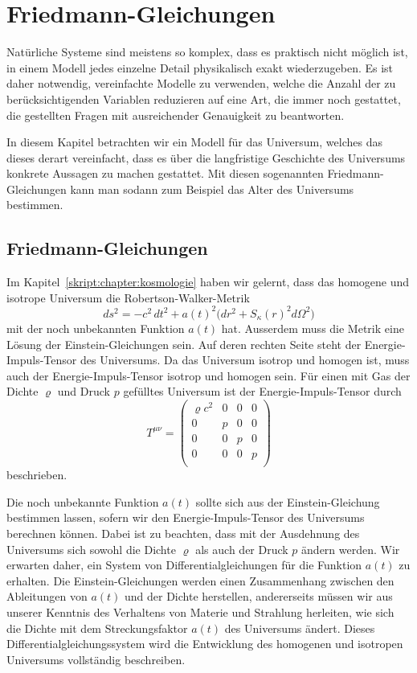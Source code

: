 %
%
%
\chapter{Friedmann-Gleichungen%
\label{skript:chapter:friedmann}}
\rhead{}
Natürliche Systeme sind meistens so komplex, dass es praktisch nicht
möglich ist, in einem Modell jedes einzelne Detail physikalisch exakt
wiederzugeben.
Es ist daher notwendig, vereinfachte Modelle zu verwenden, welche 
die Anzahl der zu berücksichtigenden Variablen reduzieren auf eine
Art, die immer noch gestattet, die gestellten Fragen mit ausreichender
Genauigkeit zu beantworten.

In diesem Kapitel betrachten wir ein Modell für das Universum, welches
das dieses derart vereinfacht, dass es über die langfristige
Geschichte des Universums konkrete Aussagen zu machen gestattet.
Mit diesen sogenannten Friedmann-Gleichungen kann man sodann zum
Beispiel das Alter des Universums bestimmen.

\section{Friedmann-Gleichungen}
Im Kapitel~\ref{skript:chapter:kosmologie} haben wir gelernt, dass
das homogene und isotrope Universum die Robertson-Walker-Metrik 
\[
ds^2
=
-c^2\,dt^2
+
a(t)^2\bigl(
dr^2 + S_\kappa(r)^2d\Omega^2
\bigr)
\]
mit der noch unbekannten Funktion $a(t)$ hat.
Ausserdem muss die Metrik eine Lösung der Einstein-Gleichungen sein.
Auf deren rechten Seite steht der Energie-Impuls-Tensor des Universums.
Da das Universum isotrop und homogen ist, muss auch der Energie-Impuls-Tensor
isotrop und homogen sein.
Für einen mit Gas der Dichte $\varrho$ und Druck $p$ gefülltes Universum
ist der Energie-Impuls-Tensor durch
\[
T^{\mu\nu}
=
\begin{pmatrix}
\varrho c^2 & 0 & 0 & 0 \\
     0      & p & 0 & 0 \\
     0      & 0 & p & 0 \\
     0      & 0 & 0 & p \\
\end{pmatrix}
\]
beschrieben.

Die noch unbekannte Funktion $a(t)$ sollte sich aus der
Einstein-Gleichung bestimmen lassen, sofern wir den Energie-Impuls-Tensor
des Universums berechnen können.
Dabei ist zu beachten, dass mit der Ausdehnung des Universums sich sowohl
die Dichte $\varrho$ als auch der Druck $p$ ändern werden.
Wir erwarten daher, ein System von Differentialgleichungen
für die Funktion $a(t)$ zu erhalten.
Die Einstein-Gleichungen werden einen Zusammenhang zwischen den 
Ableitungen von $a(t)$ und der Dichte herstellen,
andererseits müssen wir aus unserer Kenntnis des Verhaltens von
Materie und Strahlung herleiten, wie sich die Dichte mit dem
Streckungsfaktor  $a(t)$ des Universums ändert.
Dieses Differentialgleichungssystem wird die Entwicklung des homogenen
und isotropen Universums vollständig beschreiben.

